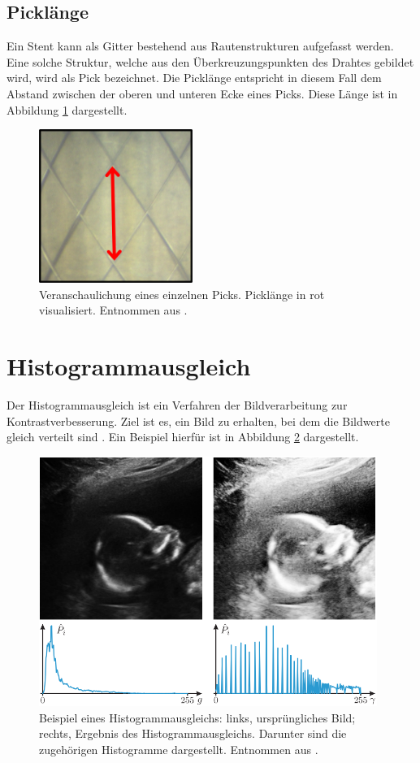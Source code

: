 \subsection{Picklänge}

Ein Stent kann als Gitter bestehend aus Rautenstrukturen aufgefasst werden. Eine solche Struktur, welche aus den Überkreuzungspunkten des Drahtes gebildet wird, wird als Pick bezeichnet. Die Picklänge entspricht in diesem Fall dem Abstand zwischen der oberen und unteren Ecke eines Picks. Diese Länge ist in Abbildung \ref{fig:picklaenge} dargestellt.

\begin{figure}[h!]
\centering
\includegraphics[width=5cm]{98_images/mittlerer_pick.png}
\caption{Veranschaulichung eines einzelnen Picks. Picklänge in rot visualisiert. Entnommen aus  \cite{flechtmaschine}.}
\label{fig:picklaenge}
\end{figure}


%
%
\section{Histogrammausgleich}\label{sec:histogramm-sec}
Der Histogrammausgleich ist ein Verfahren der Bildverarbeitung zur Kontrastverbesserung. Ziel ist es, ein Bild zu erhalten, bei dem die Bildwerte gleich verteilt sind \cite{automatische-sichtpruefung}. Ein Beispiel hierfür ist in Abbildung \ref{fig:ahe} dargestellt.

\begin{figure}[h!]
\centering
\includegraphics[width=11cm]{98_images/ahe.png}
\caption{Beispiel eines Histogrammausgleichs: links, ursprüngliches Bild; rechts, Ergebnis des Histogrammausgleichs. Darunter sind die zugehörigen Histogramme dargestellt. Entnommen aus \cite{automatische-sichtpruefung}.}
\label{fig:ahe}
\end{figure}



